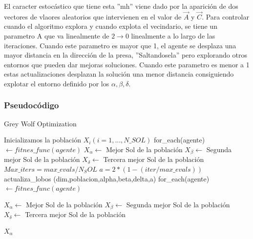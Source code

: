 \documentclass[a4paper, 12.5pt]{report}
\begin{document}
El caracter estocástico que tiene esta ''mh'' viene dado por la aparición de dos vectores de vlaores aleatorios que intervienen en el valor de $\vec{A}$ y $\vec{C}$. Para controlar cuando el algoritmo explora y cuando explota el vecindario, se tiene un parametro A que va linealmente de $2 \rightarrow 0$ linealmente a lo largo de las iteraciones. Cuando este parametro es mayor que 1, el agente se desplaza una mayor distancia en la dirección de la presa, ''Saltandosela'' pero explorando otros entornos que pueden dar mejoras soluciones. Cuando este parametro es menor a 1 estas actualizaciones desplazan la solución una menor distancia consiguiendo explotar el entorno definido por los $\alpha,\beta,\delta$.


\subsubsection*{Pseudocódigo}


\begin{algorithm}[H]
    \caption{Grey Wolf Optimization}\label{alg:GWO}
    \begin{algorithmic}[1]
        \State Inicializamos la población $X_i (i=1,...,N\_SOL)$
        \State for\_each(agente) $ \gets fitnes\_func(agente)$
        \State $X_\alpha \gets$ Mejor Sol de la población
        \State $X_\beta \gets$ Segunda mejor Sol de la población
        \State $X_\delta \gets$ Tercera mejor Sol de la población
        \State $Max\_iters=max\_evals/N_SOL$
        \State $a=2*(1-(iter/max\_evals))$
        \State actualiza\_lobos (dim,poblacion,alpha,beta,delta,a)
        \State for\_each(agente) $ \gets fitnes\_func(agente)$

        \State $X_\alpha \gets$ Mejor Sol de la población
        \State $X_\beta \gets$ Segunda mejor Sol de la población
        \State $X_\delta \gets$ Tercera mejor Sol de la población


        \EndFor

        \Return $X_\alpha $
        \EndFunction


    \end{algorithmic}
\end{algorithm}
\end{document}
